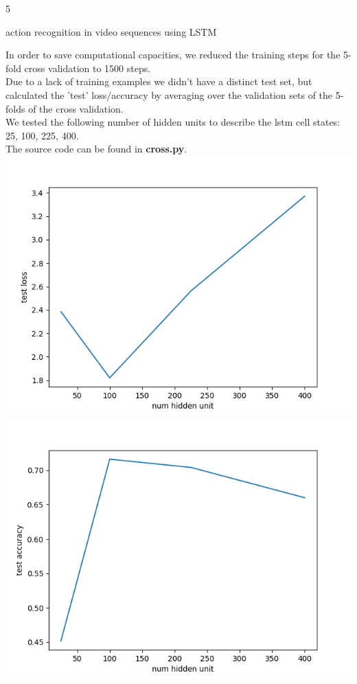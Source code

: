 \documentclass{article}
\begin{document}
\begin{ukon-infie}[18.2.18]{5}
\begin{exercise}[p=50+10]{action recognition in video sequences using LSTM}
{		}
		\question{}
		{
		In order to save computational capacities, we reduced the training steps for the 5-fold cross validation to 1500 steps. \\
		Due to a lack of training examples we didn't have a distinct test set, but calculated the 'test' loss/accuracy by averaging over the validation sets of the 5-folds of the cross validation.\\
		We tested the following number of hidden units to describe the lstm cell states: 25, 100, 225, 400.\\
		The source code can be found in \textbf{cross.py}.\\
		
		\includegraphics[scale=0.4]{cross_loss.png}
		\includegraphics[scale=0.4]{cross_accuracy.png}

}
\end{exercise}
\end{ukon-infie}
\end{document}
